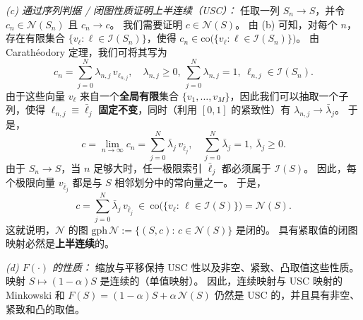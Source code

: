 \documentclass[journal]{IEEEtran}
\theoremstyle{plain}
\theoremstyle{definition}
\begin{document}
\begin{IEEEproof}
\textit{(c) 通过序列判据 / 闭图性质证明上半连续（USC）：}
任取一列 $S_n\to S$，并令 $c_n\in\mathcal N(S_n)$ 且 $c_n\to c$。
我们需要证明 $c\in\mathcal N(S)$。
由 (b) 可知，对每个 $n$，存在有限集合 $\{v_{\ell}: \ell\in\mathcal I(S_n)\}$，使得
$c_n\in\mathrm{co}\big(\{v_{\ell}:\ell\in\mathcal I(S_n)\}\big)$。
由 Carathéodory 定理，我们可将其写为
\begin{equation}
c_n=\sum_{j=0}^{N} \lambda_{n,j}\, v_{\ell_{n,j}},\quad 
\lambda_{n,j}\ge 0,\ \sum_{j=0}^{N}\lambda_{n,j}=1,\ 
\ell_{n,j}\in\mathcal I(S_n).
\end{equation}
由于这些向量 $v_{\ell}$ 来自一个\textbf{全局有限}集合 $\{v_1,\dots,v_M\}$，因此我们可以抽取一个子列，使得 $\ell_{n,j}\equiv \bar\ell_j$ \textbf{固定不变}，同时（利用 $[0,1]$ 的紧致性）有 $\lambda_{n,j}\to \bar\lambda_j$。
于是，
\begin{equation}
c=\lim_{n\to\infty} c_n=\sum_{j=0}^{N}\bar\lambda_j\, v_{\bar\ell_j},
\quad\sum_{j=0}^{N}\bar\lambda_j=1,\ \bar\lambda_j\ge 0.
\end{equation}
由于 $S_n\to S$，当 $n$ 足够大时，任一极限索引 $\bar\ell_j$ 都必须属于 $\mathcal I(S)$。
因此，每个极限向量 $v_{\bar\ell_j}$ 都是与 $S$ 相邻划分中的常向量之一。
于是，
\begin{equation}
c=\sum_{j=0}^{N}\bar\lambda_j\, v_{\bar\ell_j}\ \in\ 
\mathrm{co}\big(\{v_\ell:\,\ell\in\mathcal I(S)\}\big)=\mathcal N(S).
\end{equation}
这就说明，$\mathcal N$ 的图
$\mathrm{gph}\,\mathcal N:=\{(S,c):\,c\in\mathcal N(S)\}$
是闭的。
具有紧取值的闭图映射必然是\textbf{上半连续}的。

\textit{(d) $F(\cdot)$ 的性质：}
缩放与平移保持 USC 性以及非空、紧致、凸取值这些性质。
映射 $S\mapsto (1-\alpha)S$ 是连续的（单值映射）。
因此，连续映射与 USC 映射的 Minkowski 和
$F(S)=(1-\alpha)S+\alpha\,\mathcal N(S)$
仍然是 USC 的，并且具有非空、紧致和凸的取值。
\end{IEEEproof}
\end{document}
